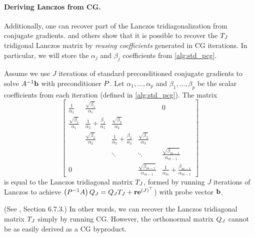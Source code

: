 \paragraph{Deriving Lanczos from CG.}
Additionally, one can recover part of the Lanczos tridiagonalization from conjugate gradients.
\citet{saad2003iterative} and others show that it is possible to recover the $T_J$ tridigonal Lanczos matrix by \emph{reusing coefficients} generated in CG iterations.
In particular, we will store the $\alpha_j$ and $\beta_j$ coefficients from \cref{alg:std_pcg}.
%
\begin{observation}
  Assume we use $J$ iterations of standard preconditioned conjugate gradients to solve $A^{-1} \mathbf{b}$ with preconditioner $P$.
  Let $\alpha_1, \ldots, \alpha_p$ and $\beta_1, \ldots, \beta_p$ be the scalar coefficients from each iteration (defined in \cref{alg:std_pcg}).
  The matrix
  \begin{equation*}
    \left[\begin{array}{ccccc}
      \frac{1}{\alpha_1} & \frac{\sqrt{\beta_1}}{\alpha_1} &  & & 0 \\
      \frac{\sqrt{\beta_1}}{\alpha_1} & \frac{1}{\alpha_2} + \frac{\beta_1}{\alpha_1} & \frac{\sqrt{\beta_2}}{\alpha_2} &  &  \\
      & \frac{\sqrt{\beta_2}}{\alpha_2} & \frac{1}{\alpha_3} + \frac{\beta_2}{\alpha_2} & \frac{\sqrt{\beta_3}}{\alpha_3} &  \\
      &       & \ddots & \ddots & \frac{\sqrt{\beta_{m-1}}}{\alpha_{m-1}} \\
      0 &       &        & \frac{\sqrt{\beta_{m-1}}}{\alpha_{m-1}} & \frac{1}{\alpha_m} + \frac{\beta_{m-1}}{\alpha_{m-1}}
    \end{array}\right]
  \end{equation*}
  is equal to the Lanczos tridiagonal matrix $T_J$, formed by running $J$ iterations of Lanczos to achieve $\left( P^{-1} A \right) Q_J = Q_J T_J + \mathbf{r} \mathbf{e}^{(J)^\top}$) with probe vector $\mathbf{b}$.
  \label{obs:lanczos_cg}
\end{observation}
(See \cite{saad2003iterative}, Section 6.7.3.)
In other words, we can recover the Lanczos tridiagonal matrix $T_J$ simply by running CG.
However, the orthonormal matrix $Q_J$ cannot be as easily derived as a CG byproduct.
